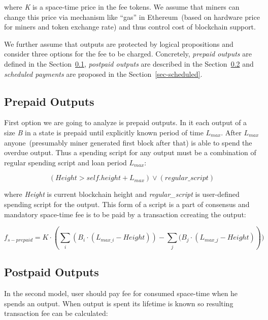 \documentclass[]{article}   %
\begin{document}
where \textit{K} is a space-time price in the fee tokens. We assume that miners can change this price via mechanism like ``gas'' in Ethereum~(based on hardware price for miners and token exchange rate) and thus control cost of blockchain support.

We further assume that outputs are protected by logical propositions and consider three options for the fee to be charged. Concretely, \textit{prepaid outputs} are defined in the Section~\ref{sec-prepaid}, \textit{postpaid outputs} are described in the Section~\ref{sec-postpaid} and \textit{scheduled payments} are proposed in the Section~\ref{sec-scheduled}.

\subsection{Prepaid Outputs}
\label{sec-prepaid}

First option we are going to analyze is prepaid outputs. In it each output of a size \textit{B} in a state is prepaid until explicitly known period of time $L_{max}$. After $L_{max}$ anyone~(presumably miner generated first block after that) is able to spend the overdue output. Thus a spending script for any output must be a combination of regular spending script and loan period $L_{max}$:

\begin{equation}
(Height > self.height + L_{max}) \lor (regular\_script)
\end{equation}

where \textit{Height} is current blockchain height and \textit{regular\_script} is user-defined spending script for the output. This form of a script is a part of consensus and mandatory space-time fee is to be paid by a transaction ccreating the output:

\begin{equation}
f_{s-prepaid} = K \cdot (\sum_i{(B_i \cdot (L_{max\_i} - Height))} - \sum_j{(B_j \cdot (L_{max\_j} - Height)}))
\end{equation}

\subsection{Postpaid Outputs}
\label{sec-postpaid}


In the second model, user should pay fee for consumed space-time when he spends an output. When output is spent its lifetime is known so resulting transaction fee can be calculated:
\end{document}
